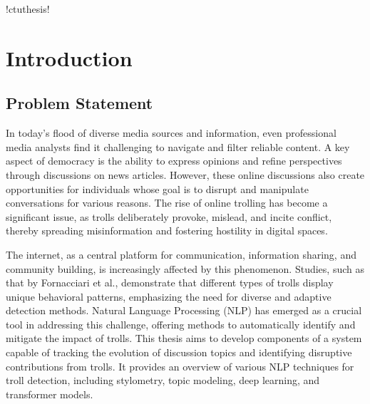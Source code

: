 \documentclass[twoside]{ctuthesis}
\theoremstyle{plain}
\theoremstyle{definition}
\theoremstyle{note}
\begin{document}
\renewcommand \ctulstsep{0pt}

\newcommand\ctuclsname{\leavevmode\unhcopy\ctuclsnamebox}
\newsavebox\ctuclsnamebox
\begin{lrbox}{\ctuclsnamebox}
\ctulst!ctuthesis!
\end{lrbox}

\maketitle

\chapter{Introduction}

\section{Problem Statement}
\par
In today’s flood of diverse media sources and information, even professional media analysts find it challenging to navigate and filter reliable content. A key aspect of democracy is the ability to express opinions and refine perspectives through discussions on news articles. However, these online discussions also create opportunities for individuals whose goal is to disrupt and manipulate conversations for various reasons. The rise of online trolling has become a significant issue, as trolls deliberately provoke, mislead, and incite conflict, thereby spreading misinformation and fostering hostility in digital spaces.\par
The internet, as a central platform for communication, information sharing, and community building, is increasingly affected by this phenomenon. Studies, such as that by Fornacciari et al.\cite{Fornacciari2018}, demonstrate that different types of trolls display unique behavioral patterns, emphasizing the need for diverse and adaptive detection methods. Natural Language Processing (NLP) has emerged as a crucial tool in addressing this challenge, offering methods to automatically identify and mitigate the impact of trolls. This thesis aims to develop components of a system capable of tracking the evolution of discussion topics and identifying disruptive contributions from trolls. It provides an overview of various NLP techniques for troll detection, including stylometry, topic modeling, deep learning, and transformer models.
\end{document}
